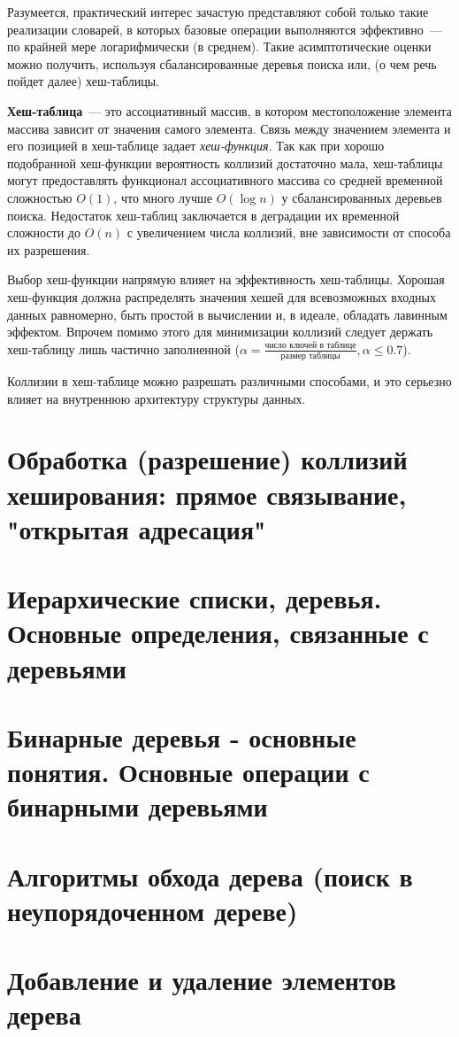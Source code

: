 Разумеется, практический интерес зачастую представляют собой только такие реализации словарей, в которых базовые операции выполняются эффективно~---
по крайней мере логарифмически (в среднем). Такие асимптотические оценки можно получить, используя сбалансированные деревья поиска или,
(о чем речь пойдет далее) хеш-таблицы.

\textbf{Хеш-таблица}~--- это ассоциативный массив, в котором местоположение элемента массива зависит от значения самого элемента.
Связь между значением элемента и его позицией в хеш-таблице задает \textit{хеш-функция}.
Так как при хорошо подобранной хеш-функции вероятность коллизий достаточно мала, хеш-таблицы могут предоставлять функционал ассоциативного массива
со средней временной сложностью $O(1)$, что много лучше $O(\log{n})$ у сбалансированных деревьев поиска. Недостаток хеш-таблиц заключается в
деградации их временной сложности до $O(n)$ с увеличением числа коллизий, вне зависимости от способа их разрешения.

Выбор хеш-функции напрямую влияет на эффективность хеш-таблицы. Хорошая хеш-функция должна распределять значения хешей для всевозможных входных данных равномерно,
быть простой в вычислении и, в идеале, обладать лавинным эффектом. Впрочем помимо этого для минимизации коллизий следует держать хеш-таблицу лишь
частично заполненной ($\alpha = \frac{\text{число ключей в таблице}}{\text{размер таблицы}}, \alpha \leq 0.7$).

Коллизии в хеш-таблице можно разрешать различными способами, и это серьезно влияет на внутреннюю архитектуру структуры данных.

\section{Обработка (разрешение) коллизий хеширования: прямое связывание, "открытая адресация"}
\label{sec:hashtable-collisions}
\section{Иерархические списки, деревья. Основные определения, связанные с деревьями}
\section{Бинарные деревья - основные понятия. Основные операции с бинарными деревьями}
\section{Алгоритмы обхода дерева (поиск в неупорядоченном дереве)}
\section{Добавление и удаление элементов дерева}
